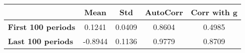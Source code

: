 \begin{tiny}\begin{tabular}{|l|c|c|c|c|}
\hline
&\textbf{Mean}&\textbf{Std}&\textbf{AutoCorr}&\textbf{Corr with g}\\\hline
\textbf{First 100 periods}&0.1241&0.0409&0.8604&0.4985\\\hline
\textbf{Last 100 periods}&-0.8944&0.1136&0.9779&0.8709\\\hline
\end{tabular}
\end{tiny}